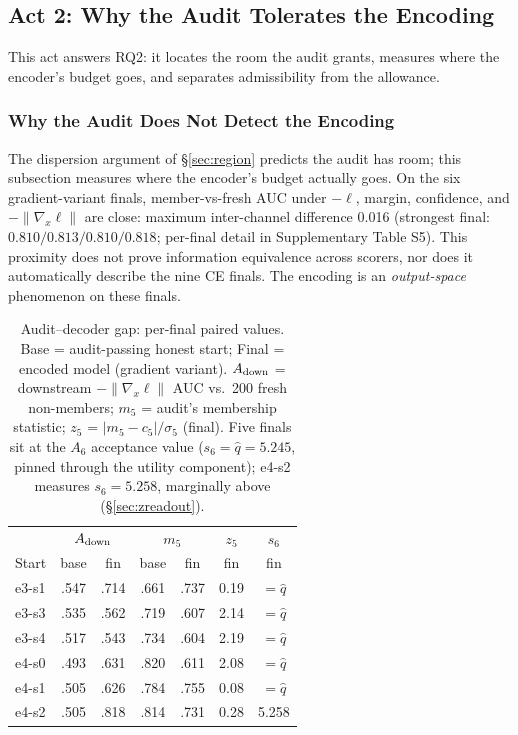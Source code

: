 \documentclass[lettersize,journal]{IEEEtran}
\begin{document}
\subsection{Act 2: Why the Audit Tolerates the Encoding}
This act answers RQ2: it locates the room the audit grants,
measures where the encoder's budget goes, and separates
admissibility from the allowance.

\subsubsection{Why the Audit Does Not Detect the Encoding}
\label{sec:decode-gap}
The dispersion argument of \S\ref{sec:region}
predicts the audit has room; this subsection measures where
the encoder's budget actually goes. On the six
gradient-variant finals, member-vs-fresh AUC under
$-\ell$, margin, confidence, and $-\|\nabla_x\ell\|$ are close:
maximum inter-channel difference 0.016 (strongest final:
$0.810/0.813/0.810/0.818$; per-final detail in Supplementary
Table S5). This proximity does not
prove information equivalence across scorers, nor does it
automatically describe the nine CE finals. The encoding is
an \emph{output-space} phenomenon on these finals.

\begin{table}[t]
\caption{Audit--decoder gap: per-final paired values. Base =
audit-passing honest start; Final = encoded model (gradient
variant). $A_{\rm down}$ = downstream $-\|\nabla_x\ell\|$ AUC vs.\ 200
fresh non-members; $m_5$ = audit's membership statistic;
$z_5$ = $|m_5 - c_5|/\sigma_5$ (final). Five finals sit at
the $A_6$ acceptance value ($s_6{=}\hat q{=}5.245$, pinned
through the utility component); e4-s2 measures
$s_6{=}5.258$, marginally above (\S\ref{sec:zreadout}).}
\label{tab:mb-paired}
\centering
\small
\setlength{\tabcolsep}{3pt}
\begin{tabular}{lcccccc}
\toprule
 & \multicolumn{2}{c}{$A_{\rm down}$} & \multicolumn{2}{c}{$m_5$} &
$z_5$ & $s_6$ \\
Start & base & fin & base & fin & fin & fin \\
\midrule
e3-s1 & .547 & .714 & .661 & .737 & 0.19 & $=\hat q$ \\
e3-s3 & .535 & .562 & .719 & .607 & 2.14 & $=\hat q$ \\
e3-s4 & .517 & .543 & .734 & .604 & 2.19 & $=\hat q$ \\
e4-s0 & .493 & .631 & .820 & .611 & 2.08 & $=\hat q$ \\
e4-s1 & .505 & .626 & .784 & .755 & 0.08 & $=\hat q$ \\
e4-s2 & .505 & .818 & .814 & .731 & 0.28 & 5.258 \\
\bottomrule
\end{tabular}
\end{table}
\end{document}
